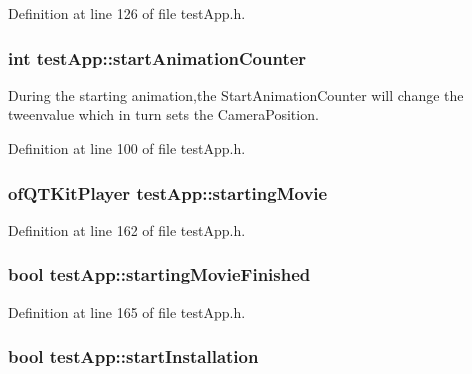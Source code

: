 Definition at line 126 of file test\-App.\-h.

\hypertarget{classtest_app_a577bf117cf10109de967ea0d3ca17f1f}{
\subsubsection[{start\-Animation\-Counter}]{\setlength{\rightskip}{0pt plus 5cm}int test\-App\-::start\-Animation\-Counter}}\label{classtest_app_a577bf117cf10109de967ea0d3ca17f1f}


During the starting animation,the Start\-Animation\-Counter will change the tweenvalue which in turn sets the Camera\-Position. 



Definition at line 100 of file test\-App.\-h.

\hypertarget{classtest_app_a9bfe7793fa0689a991ff64174745c38f}{
\subsubsection[{starting\-Movie}]{\setlength{\rightskip}{0pt plus 5cm}of\-Q\-T\-Kit\-Player test\-App\-::starting\-Movie}}\label{classtest_app_a9bfe7793fa0689a991ff64174745c38f}


Definition at line 162 of file test\-App.\-h.

\hypertarget{classtest_app_aea3cb9f5f0061a42a4953d6b6c949036}{
\subsubsection[{starting\-Movie\-Finished}]{\setlength{\rightskip}{0pt plus 5cm}bool test\-App\-::starting\-Movie\-Finished}}\label{classtest_app_aea3cb9f5f0061a42a4953d6b6c949036}


Definition at line 165 of file test\-App.\-h.

\hypertarget{classtest_app_a8a65a6d1a473417cec1c2ac2e6116aae}{
\subsubsection[{start\-Installation}]{\setlength{\rightskip}{0pt plus 5cm}bool test\-App\-::start\-Installation}}\label{classtest_app_a8a65a6d1a473417cec1c2ac2e6116aae}


